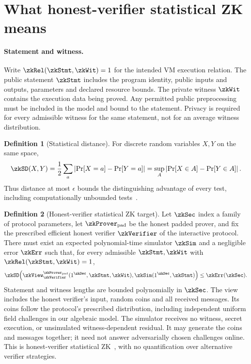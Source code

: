 \documentclass[11pt]{article}
\theoremstyle{definition}
\newtheorem{definition}{Definition}
\begin{document}
\section{What honest-verifier statistical ZK means}\label{sec:zk-definition}

\paragraph{Statement and witness.} Write $\zkRel(\zkStmt,\zkWit)=1$ for the intended VM execution relation. The public statement $\zkStmt$ includes the program identity, public inputs and outputs, parameters and declared resource bounds. The private witness $\zkWit$ contains the execution data being proved. Any permitted public preprocessing must be included in the model and bound to the statement. Privacy is required for every admissible witness for the same statement, not for an average witness distribution.

\begin{definition}[Statistical distance]
For discrete random variables $X,Y$ on the same space,
\[
 \zkSD(X,Y)
 =\frac12\sum_a\left|\Pr[X=a]-\Pr[Y=a]\right|
 =\sup_A\left|\Pr[X\in A]-\Pr[Y\in A]\right|.
\]
Thus distance at most $\epsilon$ bounds the distinguishing advantage of every test, including computationally unbounded tests~\cite{distance}.
\end{definition}

\begin{definition}[Honest-verifier statistical ZK target]\label{def:zk-target}
Let $\zkSec$ index a family of protocol parameters, let $\zkProver_{\mathrm{pad}}$ be the honest padded prover, and fix the prescribed efficient honest verifier $\zkVerifier$ of the interactive protocol. There must exist an expected polynomial-time simulator $\zkSim$ and a negligible error $\zkErr$ such that, for every admissible $\zkStmt,\zkWit$ with $\zkRel(\zkStmt,\zkWit)=1$,
\[
 \zkSD\!\left(
 \zkView_{\zkVerifier}^{\zkProver_{\mathrm{pad}}}
      (1^{\zkSec},\zkStmt,\zkWit),
 \zkSim(1^{\zkSec},\zkStmt)
 \right)
 \le \zkErr(\zkSec).
\]
Statement and witness lengths are bounded polynomially in $\zkSec$. The view includes the honest verifier's input, random coins and all received messages. Its coins follow the protocol's prescribed distribution, including independent uniform field challenges in our algebraic model. The simulator receives no witness, secret execution, or unsimulated witness-dependent residual. It may generate the coins and messages together; it need not answer adversarially chosen challenges online. This is honest-verifier statistical ZK~\cite{zk-definition}, with no quantification over alternative verifier strategies.
\end{definition}
\end{document}
